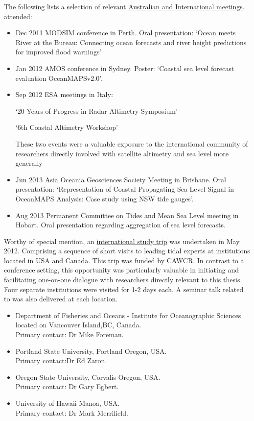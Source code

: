 The following lists a selection of relevant \underline{Australian and International meetings.} attended:
\begin{itemize}
\item Dec 2011 MODSIM conference in Perth.  Oral presentation: `Ocean meets River at the Bureau: Connecting ocean forecasts and river height predictions for improved flood warnings'  \citep{Taylor:2011ud}\\
\item Jan 2012 AMOS conference in Sydney.  Poster: `Coastal sea level forecast evaluation OceanMAPSv2.0'. \\
\item Sep 2012 ESA meetings in Italy:
\par `20 Years of Progress in Radar Altimetry Symposium'
\par `6th Coastal Altimetry Workshop'
\par These two events were a valuable exposure to the international community of researchers directly involved with satellite altimetry and sea level more generally\\
\item Jun 2013 Asia Oceania Geosciences Society Meeting in Brisbane.  Oral presentation: `Representation of Coastal Propagating Sea Level Signal in OceanMAPS Analysis: Case study using NSW tide gauges'.
\item Aug 2013 Permanent Committee on Tides and Mean Sea Level meeting in Hobart.  Oral presentation regarding aggregation of sea level forecasts.
\end{itemize}



Worthy of special mention, an \underline{international study trip} was undertaken in May 2012. Comprising a sequence of short visits to leading tidal experts at institutions located in USA and Canada. This trip was funded by CAWCR.   In contrast to a conference setting, this opportunity was particularly valuable in initiating and facilitating one-on-one dialogue with researchers directly relevant to this thesis.\\
Four separate institutions were visited for 1-2 days each.  A seminar talk related to \BL{} was also delivered at each location.    
\begin{itemize}
\item Department of Fisheries and Oceans - Institute for Oceanographic Sciences located on Vancouver Island,BC, Canada. \\
Primary contact: Dr Mike Foreman.
\item Portland State University, Portland Oregon, USA. \\
Primary contact:Dr Ed Zaron.
\item Oregon State University, Corvalis Oregon, USA.\\
Primary contact: Dr Gary Egbert.
\item University of Hawaii Manoa, USA.\\
Primary contact: Dr Mark Merrifield.
\end{itemize}



